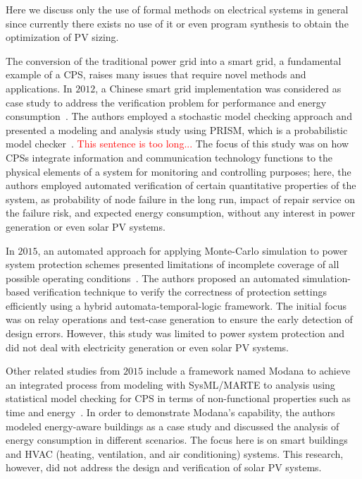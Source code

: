 Here we discuss only the use of formal methods on electrical systems in general since currently there exists no use of it or even program synthesis to obtain the optimization of PV sizing.

The conversion of the traditional power grid into a smart grid, a fundamental example of a CPS, raises many issues that require novel methods and applications. In $2012$, a Chinese smart grid implementation was considered as case study to address the verification problem for performance and energy consumption~\cite{Yukseletall2012}. The authors employed a stochastic model checking approach and presented a modeling and analysis study using PRISM, which is a probabilistic model checker~\cite{KwiatkowskaNP11}. \textcolor{red}{This sentence is too long...} The focus of this study was on how CPSs integrate information and communication technology functions to the physical elements of a system for monitoring and controlling purposes; here, the authors employed automated verification of certain quantitative properties of the system, as probability of node failure in the long run, impact of repair service on the failure risk, and expected energy consumption, without any interest in power generation or even solar PV systems.

In $2015$, an automated approach for applying Monte-Carlo simulation to power system protection schemes presented limitations of incomplete coverage of all possible operating conditions~\cite{Sengupta2015}. The authors proposed an automated simulation-based verification technique to verify the correctness of protection settings efficiently using a hybrid automata-temporal-logic framework. The initial focus was on relay operations and test-case generation to ensure the early detection of design errors. However, this study was limited to power system protection and did not deal with electricity generation or even solar PV systems.

Other related studies from $2015$ include a framework named Modana to achieve an integrated process from modeling with SysML/MARTE to analysis using statistical model checking for CPS in terms of non-functional properties such as time and energy~\cite{Cheng2015}. In order to demonstrate Modana's capability, the authors modeled energy-aware buildings as a case study and discussed the analysis of energy consumption in different scenarios. The focus here is on smart buildings and HVAC (heating, ventilation, and air conditioning) systems. This research, however, did not address the design and verification of solar PV systems. 
 
